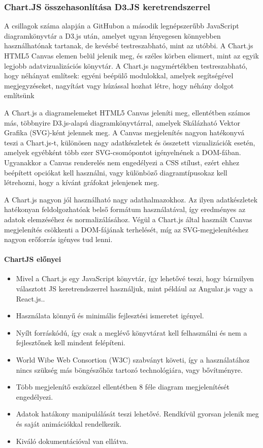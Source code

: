\subsubsection{Chart.JS összehasonlítása D3.JS keretrendszerrel}
A csillagok száma alapján a GitHubon a második legnépszerűbb JavaScript diagramkönyvtár a D3.js után, amelyet ugyan lényegesen könnyebben használhatónak tartanak, de kevésbé testreszabható, mint az utóbbi. A Chart.js HTML5 Canvas elemen belül jelenik meg, és széles körben elismert, mint az egyik legjobb adatvizualizációs könyvtár.
A Chart.js nagymértékben testreszabható, hogy néhányat említsek: egyéni beépülő modulokkal, amelyek segítségével megjegyzéseket, nagyítást vagy húzással hozhat létre, hogy néhány dolgot említsünk 

	A Chart.js a diagramelemeket HTML5 Canvas jeleníti meg, ellentétben számos más, többnyire D3.js-alapú diagramkönyvtárral, amelyek Skálázható Vektor Grafika (SVG)-ként jelennek meg. A Canvas megjelenítés nagyon hatékonyvá teszi a Chart.js-t, különösen nagy adatkészletek és összetett vizualizációk esetén, amelyek egyébként több ezer SVG-csomópontot igényelnének a DOM-fában. Ugyanakkor a Canvas renderelés nem engedélyezi a CSS stílust, ezért ehhez beépített opciókat kell használni, vagy különböző diagramtípusokaz kell létrehozni, hogy a kívánt gráfokat jelenjenek meg. 

	A Chart.js nagyon jól használható nagy adathalmazokhoz. Az ilyen adatkészletek hatékonyan feldolgozhatóak belső formátum használatával, így eredményes az adatok elemzéséhez és normalizálásához. Végül a Chart.js által használt Canvas megjelenítés csökkenti a DOM-fájának terhelését, míg az SVG-megjelenítéshez nagyon erőforrás igényes tud lenni. \cite{wikiChart}

\paragraph{ChartJS előnyei}

\begin{itemize}
\item Mivel a Chart.js egy JavaScript könyvtár, így lehetővé teszi, hogy bármilyen választott JS keretrendszerrel használjuk, mint például az Angular.js vagy a React.js..
\item Használata könnyű és minimális fejlesztési ismeretet igényel.
\item Nyílt forráskódú, így csak a meglévő könyvtárat kell felhasználni és nem a fejlesztőnek kell mindent felépíteni.
\item World Wibe Web Consortion (W3C) szabványt követi, így a használatához nincs szükség más böngészőhöz tartozó technológiára, vagy bővítményre.
\item Több megjelenítő eszközzel ellentétben 8 féle diagram megjelenítését engedélyezi.
\item Adatok hatákony manipulálását teszi lehetővé. Rendkívül gyorsan jelenik meg és saját animációkkal rendelkezik.
\item Kiváló dokumentációval van ellátva.
\end{itemize}
